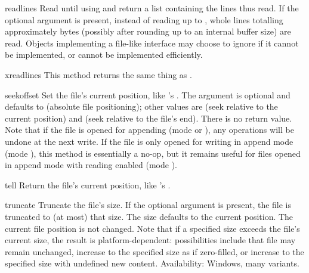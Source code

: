 \begin{methoddesc}[file]{readlines}{}
  Read until \EOF{} using  and return a list containing
  the lines thus read.  If the optional  argument is
  present, instead of reading up to \EOF, whole lines totalling
  approximately  bytes (possibly after rounding up to an
  internal buffer size) are read.  Objects implementing a file-like
  interface may choose to ignore  if it cannot be
  implemented, or cannot be implemented efficiently.
\end{methoddesc}

\begin{methoddesc}[file]{xreadlines}{}
  This method returns the same thing as .
\end{methoddesc}

\begin{methoddesc}[file]{seek}{offset}
  Set the file's current position, like 's .
  The  argument is optional and defaults to 
  (absolute file positioning); other values are  (seek
  relative to the current position) and  (seek relative to the
  file's end).  There is no return value.  Note that if the file is
  opened for appending (mode  or ), any
   operations will be undone at the next write.  If the
  file is only opened for writing in append mode (mode ),
  this method is essentially a no-op, but it remains useful for files
  opened in append mode with reading enabled (mode ).
\end{methoddesc}

\begin{methoddesc}[file]{tell}{}
  Return the file's current position, like 's
  .
\end{methoddesc}

\begin{methoddesc}[file]{truncate}{}
  Truncate the file's size.  If the optional  argument is
  present, the file is truncated to (at most) that size.  The size
  defaults to the current position.  The current file position is
  not changed.  Note that if a specified size exceeds the file's
  current size, the result is platform-dependent:  possibilities
  include that file may remain unchanged, increase to the specified
  size as if zero-filled, or increase to the specified size with
  undefined new content.
  Availability:  Windows, many \UNIX{} variants.
\end{methoddesc}

